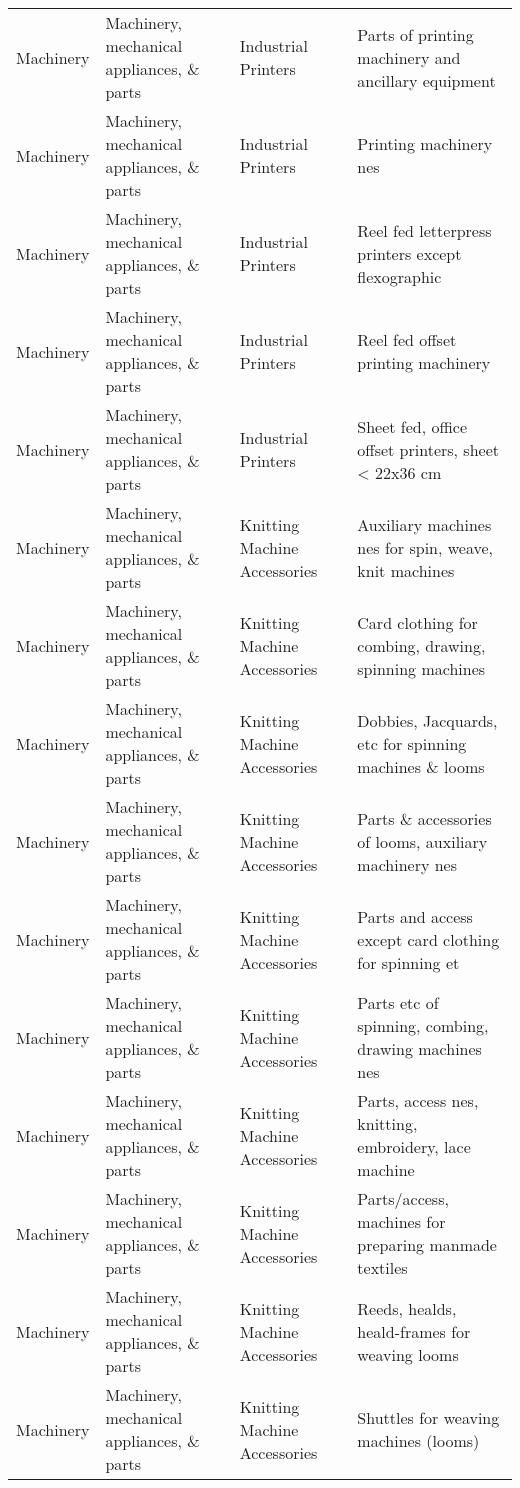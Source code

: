 \begin{appendices}
\begin{xltabular}{\textwidth}{|p{0.07\textwidth}|p{0.25\textwidth}|p{0.28\textwidth}|p{0.3\textwidth}|}
		Machinery & Machinery, mechanical appliances, \& parts & Industrial Printers & Parts of printing machinery and ancillary equipment \\
		Machinery & Machinery, mechanical appliances, \& parts & Industrial Printers & Printing machinery nes \\
		Machinery & Machinery, mechanical appliances, \& parts & Industrial Printers & Reel fed letterpress printers except flexographic \\
		Machinery & Machinery, mechanical appliances, \& parts & Industrial Printers & Reel fed offset printing machinery \\
		Machinery & Machinery, mechanical appliances, \& parts & Industrial Printers & Sheet fed, office offset printers, sheet < 22x36 cm \\
		Machinery & Machinery, mechanical appliances, \& parts & Knitting Machine Accessories & Auxiliary machines nes for spin, weave, knit machines \\
		Machinery & Machinery, mechanical appliances, \& parts & Knitting Machine Accessories & Card clothing for combing, drawing, spinning machines \\
		Machinery & Machinery, mechanical appliances, \& parts & Knitting Machine Accessories & Dobbies, Jacquards, etc for spinning machines \& looms \\
		Machinery & Machinery, mechanical appliances, \& parts & Knitting Machine Accessories & Parts \& accessories of looms, auxiliary machinery nes \\
		Machinery & Machinery, mechanical appliances, \& parts & Knitting Machine Accessories & Parts and access except card clothing for spinning et \\
		Machinery & Machinery, mechanical appliances, \& parts & Knitting Machine Accessories & Parts etc of spinning, combing, drawing machines nes \\
		Machinery & Machinery, mechanical appliances, \& parts & Knitting Machine Accessories & Parts, access nes, knitting, embroidery, lace machine \\
		Machinery & Machinery, mechanical appliances, \& parts & Knitting Machine Accessories & Parts/access, machines for preparing manmade textiles \\
		Machinery & Machinery, mechanical appliances, \& parts & Knitting Machine Accessories & Reeds, healds, heald-frames for weaving looms \\
		Machinery & Machinery, mechanical appliances, \& parts & Knitting Machine Accessories & Shuttles for weaving machines (looms) \\

\end{xltabular}
\end{appendices}
